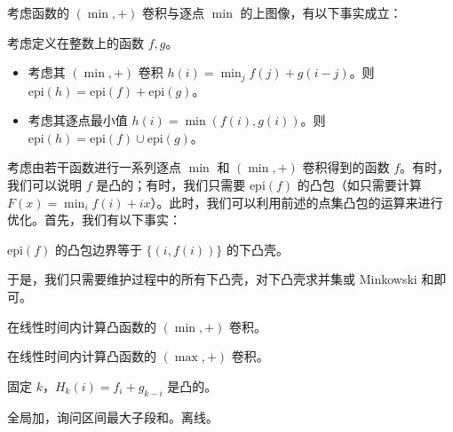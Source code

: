 考虑函数的 $(\min,+)$ 卷积与逐点 $\min$ 的上图像，有以下事实成立： 
\begin{fact}
    考虑定义在整数上的函数 $f,g$。
    \begin{itemize}
        \item 考虑其 $(\min,+)$ 卷积 $h(i)=\min_{j}f(j)+g(i-j)$。则 $\mathrm{epi}(h)=\mathrm{epi}(f)+\mathrm{epi}(g)$。
        \item 考虑其逐点最小值 $h(i)=\min(f(i),g(i))$。则 $\mathrm{epi}(h)=\mathrm{epi}(f)\cup \mathrm{epi}(g)$。
    \end{itemize}
\end{fact}
考虑由若干函数进行一系列逐点 $\min$ 和 $(\min,+)$ 卷积得到的函数 $f$。有时，我们可以说明 $f$ 是凸的；有时，我们只需要 $\mathrm{epi}(f)$ 的凸包（如只需要计算 $F(x)=\min_i f(i)+ix$）。此时，我们可以利用前述的点集凸包的运算来进行优化。首先，我们有以下事实：
\begin{fact}
    $\mathrm{epi}(f)$ 的凸包边界等于 $\{(i,f(i))\}$ 的下凸壳。
\end{fact}
于是，我们只需要维护过程中的所有下凸壳，对下凸壳求并集或 Minkowski 和即可。

\begin{example}
    在线性时间内计算凸函数的 $(\min,+)$ 卷积。
\end{example}
\begin{exercise}
    在线性时间内计算凸函数的 $(\max,+)$ 卷积。
    \begin{hint}
        固定 $k$，$H_k(i)=f_i+g_{k-i}$ 是凸的。
    \end{hint}
\end{exercise}

\begin{example}
    全局加，询问区间最大子段和。离线。
\end{example}



